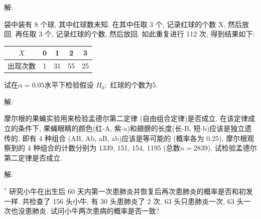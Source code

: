 \documentclass[standard]{ExBook}
\begin{document}
\begin{qitems}
    \begin{bbox}
解: 
    \end{bbox}

\vspace{-5em}

    \begin{bbox}
    \begin{shaded}
        \qitem
袋中装有 8 个球, 其中红球数未知. 在其中任取 3 个, 记录红球的个数 X, 然后放回. 再任取 3 个, 记录红球的个数, 然后放回. 如此重复进行 112 次, 得到结果如下:
\begin{center}
\setlength{\tabcolsep}{40pt}
\begin{tabular}{c|cccc}
\hline
$X$ & 0 & 1 & 2 & 3 \\
\hline
出现次数 & 1 & 31 & 55 & 25 \\
\hline
\end{tabular}
\end{center}
试在$\alpha=0.05$水平下检验假设 $H_0 : $ 红球的个数为5.
    \end{shaded}
    \end{bbox}

\vspace{-5em}

    \begin{bbox}
解: 
    \end{bbox}

\vspace{-5em}

    \begin{bbox}
    \begin{shaded}
        \qitem
摩尔根的果蝇实验用来检验孟德尔第二定律 (自由组合定律)是否成立. 在该定律成立的条件下, 果蝇眼睛的颜色(红-A, 紫-a)和翅膀的长度(长-B, 短-b)应该是独立遗传的, 即有 4 种组合 (AB, Ab, aB, ab)应该是等可能的 (概率各为 0.25). 摩尔根观察到的 4 种组合的计数分别为 1339, 151, 154, 1195 (总数$n=2839$). 试检验孟德尔第二定律是否成立.
    \end{shaded}
    \end{bbox}

\vspace{-5em}

    \begin{bbox}
解: 
    \end{bbox}

\vspace{-5em}

    \begin{bbox}
    \begin{shaded}
        \qitem$^*$
研究小牛在出生后 60 天内第一次患肺炎并恢复后再次患肺炎的概率是否和初发一样. 共检查了 156 头小牛, 有 30 头患肺炎了 2 次, 63 头只患肺炎一次, 63 头一次也没患肺炎. 试问小牛两次患病的概率是否一致?
    \end{shaded}
    \end{bbox}


\end{qitems}
\end{document}
